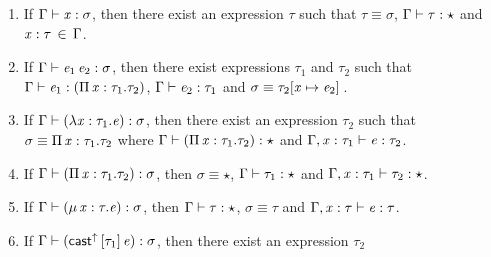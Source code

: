 \begin{lem}[Generation]\label{lem:appendix:gen}
$\quad$
\begin{enumerate}[(1)]
	\item If $\Gamma  \vdash  \mathit{x}  :  \sigma$, then there exist an expression $\tau$ such that $\tau  \equiv  \sigma$, $\Gamma  \vdash  \tau  :  \star$ and $\mathit{x}  :  \tau \, \in \, \Gamma$.
	\item If $\Gamma  \vdash  \mathit{e_{{\mathrm{1}}}} \, \mathit{e_{{\mathrm{2}}}}  :  \sigma$, then there exist expressions $\tau_{{\mathrm{1}}}$ and
$\tau_{{\mathrm{2}}}$ such that $\Gamma  \vdash  \mathit{e_{{\mathrm{1}}}}  :  (  \Pi \, \mathit{x}  :  \tau_{{\mathrm{1}}}  .  \tau_{{\mathrm{2}}}  )$, $\Gamma  \vdash  \mathit{e_{{\mathrm{2}}}}  :  \tau_{{\mathrm{1}}}$ and $\sigma  \equiv  \tau_{{\mathrm{2}}}  [  \mathit{x}  \mapsto  \mathit{e_{{\mathrm{2}}}}  ] \,$.
	\item If $\Gamma  \vdash  (  \lambda  \mathit{x}  :  \tau_{{\mathrm{1}}}  .  \mathit{e}  )  :  \sigma$, then there exist an expression $\tau_{{\mathrm{2}}}$ such
that $\sigma  \equiv  \Pi \, \mathit{x}  :  \tau_{{\mathrm{1}}}  .  \tau_{{\mathrm{2}}}$ where $\Gamma  \vdash  (  \Pi \, \mathit{x}  :  \tau_{{\mathrm{1}}}  .  \tau_{{\mathrm{2}}}  )  :  \star$ and $\Gamma  ,  \mathit{x}  :  \tau_{{\mathrm{1}}}  \vdash  \mathit{e}  :  \tau_{{\mathrm{2}}}$.
    \item If $\Gamma  \vdash  (  \Pi \, \mathit{x}  :  \tau_{{\mathrm{1}}}  .  \tau_{{\mathrm{2}}}  )  :  \sigma$, then $\sigma  \equiv  \star$, $\Gamma  \vdash  \tau_{{\mathrm{1}}}  :  \star$ and
$\Gamma  ,  \mathit{x}  :  \tau_{{\mathrm{1}}}  \vdash  \tau_{{\mathrm{2}}}  :  \star$.
	\item If $\Gamma  \vdash  (  \mu \, \mathit{x}  :  \tau  .  \mathit{e}  )  :  \sigma$, then $\Gamma  \vdash  \tau  :  \star$, $\sigma  \equiv  \tau$ and $\Gamma  ,  \mathit{x}  :  \tau  \vdash  \mathit{e}  :  \tau$.
	\item If $\Gamma  \vdash  (  \mathsf{cast}^{\uparrow} \, [  \tau_{{\mathrm{1}}}  ] \,  \mathit{e}  )  :  \sigma$, then there exist an expression $\tau_{{\mathrm{2}}}$

\end{enumerate}
\end{lem}
